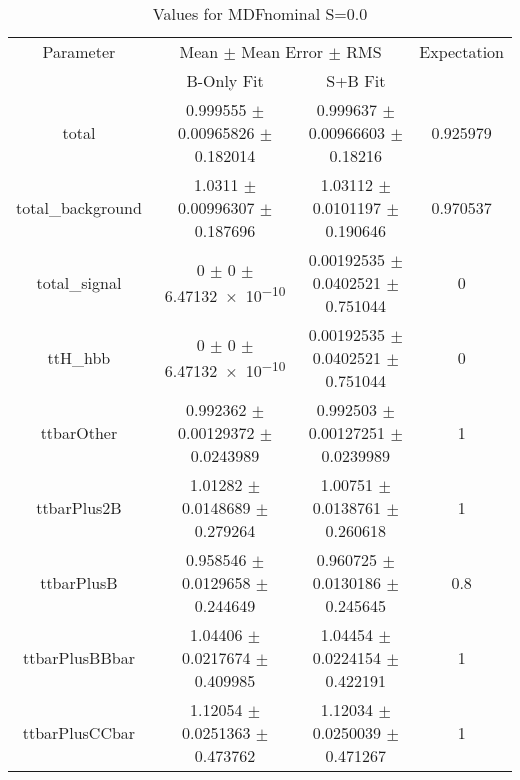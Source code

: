 \begin{table}
\centering
\caption{Values for MDFnominal S=0.0}
\begin{tabular}{cccc}
\toprule
Parameter & \multicolumn{2}{c}{Mean $\pm$ Mean Error $\pm$ RMS} & Expectation\\
 & B-Only Fit & S+B Fit & \\
\midrule
total & \num{0.999555} $\pm$ \num{0.00965826} $\pm$ \num{0.182014} & \num{0.999637} $\pm$ \num{0.00966603} $\pm$ \num{0.18216} & \num{0.925979}\\
total\_background & \num{1.0311} $\pm$ \num{0.00996307} $\pm$ \num{0.187696} & \num{1.03112} $\pm$ \num{0.0101197} $\pm$ \num{0.190646} & \num{0.970537}\\
total\_signal & \num{0} $\pm$ \num{0} $\pm$ \num{6.47132e-10} & \num{0.00192535} $\pm$ \num{0.0402521} $\pm$ \num{0.751044} & \num{0}\\
ttH\_hbb & \num{0} $\pm$ \num{0} $\pm$ \num{6.47132e-10} & \num{0.00192535} $\pm$ \num{0.0402521} $\pm$ \num{0.751044} & \num{0}\\
ttbarOther & \num{0.992362} $\pm$ \num{0.00129372} $\pm$ \num{0.0243989} & \num{0.992503} $\pm$ \num{0.00127251} $\pm$ \num{0.0239989} & \num{1}\\
ttbarPlus2B & \num{1.01282} $\pm$ \num{0.0148689} $\pm$ \num{0.279264} & \num{1.00751} $\pm$ \num{0.0138761} $\pm$ \num{0.260618} & \num{1}\\
ttbarPlusB & \num{0.958546} $\pm$ \num{0.0129658} $\pm$ \num{0.244649} & \num{0.960725} $\pm$ \num{0.0130186} $\pm$ \num{0.245645} & \num{0.8}\\
ttbarPlusBBbar & \num{1.04406} $\pm$ \num{0.0217674} $\pm$ \num{0.409985} & \num{1.04454} $\pm$ \num{0.0224154} $\pm$ \num{0.422191} & \num{1}\\
ttbarPlusCCbar & \num{1.12054} $\pm$ \num{0.0251363} $\pm$ \num{0.473762} & \num{1.12034} $\pm$ \num{0.0250039} $\pm$ \num{0.471267} & \num{1}\\
\bottomrule
\end{tabular}
\end{table}